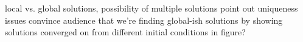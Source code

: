 local vs. global solutions, possibility of multiple solutions
point out uniqueness issues
convince audience that we're finding global-ish solutions by showing solutions converged on from different initial conditions in figure?